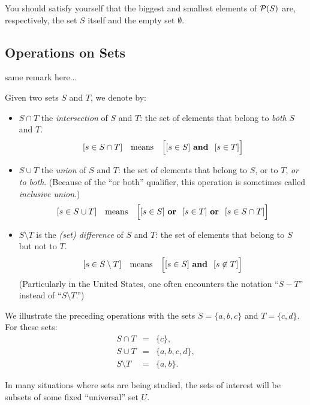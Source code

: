 \noindent
You should satisfy yourself that the biggest and smallest elements of
${\cal P}(S)$ are, respectively, the set $S$ itself and the empty set
$\emptyset$.

\subsection{Operations on Sets}
\label{sec:set-operations}

{\Denis same remark here...}

Given two sets $S$ and $T$, we denote by:
\begin{itemize}
\item
$S \cap T$ the {\it
  intersection}
of $S$ and $T$: the set of elements that belong to {\em both} $S$ and
$T$.
\[ [s \in S \cap T] \ \ \mbox{ means } \ \ 
\Big[ [s \in S] \ \mbox{\bf and } \ [s \in T] \Big]
\]

\item
$S \cup T$ the {\it
  union}
of $S$ and $T$: the set of elements that belong to $S$, or to $T$, {\em
  or to both}.  (Because of the ``or both'' qualifier, this operation
is sometimes called {\em inclusive
  union}.)
\[ [s \in S \cup T] \ \ \mbox{ means } \ \
\Big[ [s \in S] \ \mbox{\bf or } \ [s \in T]  \ \mbox{\bf or } \ [s
    \in S \cap T] \Big]
\]

\item
$S \setminus T$ is the {\em
  (set) difference} of $S$ and
  $T$: the set of elements that belong to $S$ but not to $T$.
\[ [s \in S \setminus T] \ \ \mbox{ means } \ \
\Big[ [s \in S] \ \mbox{\bf and } \ [s \not\in T] \Big]
\]
(Particularly in the United States, one often encounters the notation
 ``$S-T$''\index{$S - T$: set difference} instead of ``$S \setminus
 T$.'')
\end{itemize}

We illustrate the preceding operations with the sets $S = \{a,b,c\}$
and $T = \{c,d\}$.  For these sets:
\begin{eqnarray*}
S \cap T & = &  \{c\}, \\
S \cup T & = & \{a,b,c,d\}, \\
S \setminus T & = & \{a,b\}.
\end{eqnarray*}

In many situations where sets are being studied, the sets of interest
will be subsets of some fixed ``universal'' set
$U$.

